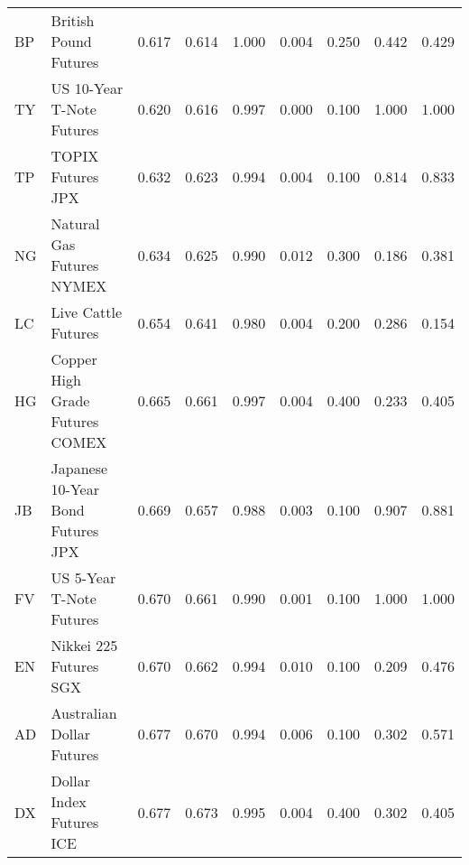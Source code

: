 \begin{longtable}{llrrrrrrr}
  BP &                          \makecell{British Pound\\Futures} &        0.617 &       0.614 &     1.000 &        0.004 &           0.250 &                0.442 &      0.429 \\
  TY &                      \makecell{US 10-Year T-Note\\Futures} &        0.620 &       0.616 &     0.997 &        0.000 &           0.100 &                1.000 &      1.000 \\
  TP &                                          TOPIX Futures JPX &        0.632 &       0.623 &     0.994 &        0.004 &           0.100 &                0.814 &      0.833 \\
  NG &                      \makecell{Natural Gas Futures\\NYMEX} &        0.634 &       0.625 &     0.990 &        0.012 &           0.300 &                0.186 &      0.381 \\
  LC &                                        Live Cattle Futures &        0.654 &       0.641 &     0.980 &        0.004 &           0.200 &                0.286 &      0.154 \\
  HG &                \makecell{Copper High Grade\\Futures COMEX} &        0.665 &       0.661 &     0.997 &        0.004 &           0.400 &                0.233 &      0.405 \\
  JB &              \makecell{Japanese 10-Year\\Bond Futures JPX} &        0.669 &       0.657 &     0.988 &        0.003 &           0.100 &                0.907 &      0.881 \\
  FV &                       \makecell{US 5-Year T-Note\\Futures} &        0.670 &       0.661 &     0.990 &        0.001 &           0.100 &                1.000 &      1.000 \\
  EN &                         \makecell{Nikkei 225 Futures\\SGX} &        0.670 &       0.662 &     0.994 &        0.010 &           0.100 &                0.209 &      0.476 \\
  AD &                      \makecell{Australian Dollar\\Futures} &        0.677 &       0.670 &     0.994 &        0.006 &           0.100 &                0.302 &      0.571 \\
  DX &                       \makecell{Dollar Index Futures\\ICE} &        0.677 &       0.673 &     0.995 &        0.004 &           0.400 &                0.302 &      0.405 \\

\end{longtable}
